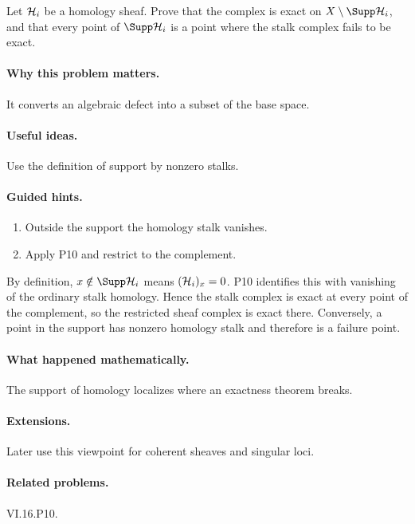 \begin{problem}\label{prob:vi16-p11}
Let $\mathcal H_i$ be a homology sheaf.  Prove that the complex is exact on $X\setminus\Supp\HH_i$, and that every point of $\Supp\HH_i$ is a point where the stalk complex fails to be exact.
\end{problem}

\ifdefined\FullProblemDossiers
\paragraph{Why this problem matters.}
It converts an algebraic defect into a subset of the base space.

\paragraph{Useful ideas.}
Use the definition of support by nonzero stalks.

\paragraph{Guided hints.}
\begin{enumerate}
\item Outside the support the homology stalk vanishes.
\item Apply P10 and restrict to the complement.
\end{enumerate}

\begin{solution}
By definition, $x\notin\Supp\HH_i$ means $(\mathcal H_i)_x=0$.  P10 identifies this with vanishing of the ordinary stalk homology.  Hence the stalk complex is exact at every point of the complement, so the restricted sheaf complex is exact there.  Conversely, a point in the support has nonzero homology stalk and therefore is a failure point.
\end{solution}

\paragraph{What happened mathematically.}
The support of homology localizes where an exactness theorem breaks.

\paragraph{Extensions.}
Later use this viewpoint for coherent sheaves and singular loci.

\paragraph{Related problems.}
VI.16.P10.
\fi

